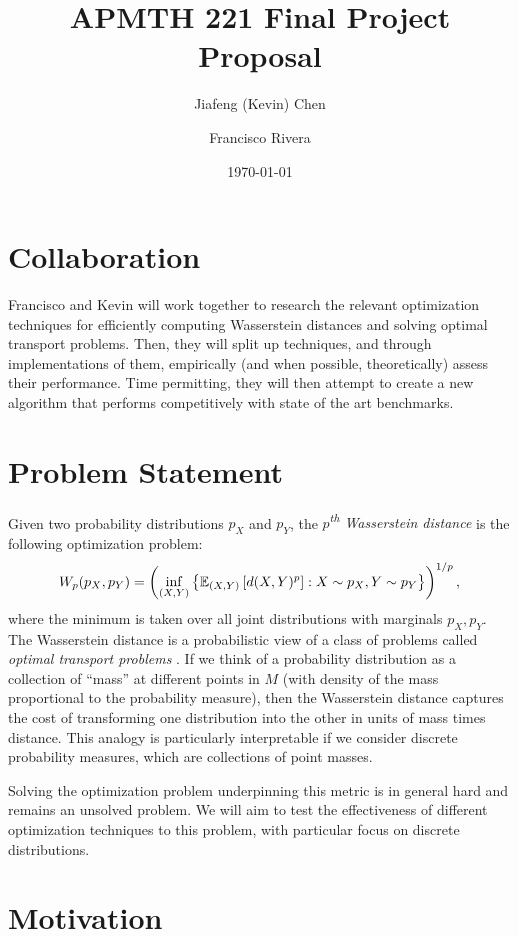 \documentclass{amsart}
\begin{document}
\title{APMTH 221 Final Project Proposal}
\author{Jiafeng (Kevin) Chen \and Francisco Rivera}
\date{\today}

\maketitle

\section{Collaboration}

Francisco and Kevin will work together to research the relevant optimization
techniques for efficiently computing Wasserstein distances and solving optimal transport problems. Then, they
will split up techniques, and through implementations of them, empirically (and
when possible, theoretically) assess their performance. Time permitting, they
will then attempt to create a new algorithm that performs competitively with
state of the art benchmarks.

\section{Problem Statement}

Given two probability distributions $p_X$ and $p_Y$, the \emph{$p$\textsuperscript{th} Wasserstein distance} is the following optimization problem: \[
W_p(p_X,p_Y) = \left({\inf_{(X,Y)} \left\{{ \mathbb{E}_{(X,Y)} \left[{d(X,Y)^p}\right]: X\sim p_X, Y\sim p_Y }\right\}}\right)^{1/p},
\]
where the minimum is taken over all joint distributions with marginals $p_X,p_Y$. The Wasserstein distance is a probabilistic view of a class of problems called \emph{optimal transport problems} \cite{peyre2017computational}. If we think of a
probability distribution as a collection of ``mass'' at different points in $M$
(with density of the mass proportional to the probability measure), then the
Wasserstein distance captures the cost of transforming one distribution into the
other in units of mass times distance.  This analogy is particularly
interpretable if we consider discrete probability measures, which are collections of point masses.

Solving the optimization problem underpinning this metric is in general hard and
remains an unsolved problem. We will aim to test the effectiveness of different
optimization techniques to this problem, with particular focus on discrete
distributions.

\section{Motivation}
\end{document}
